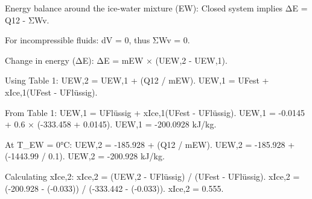 Energy balance around the ice-water mixture (EW):  
Closed system implies ΔE = Q12 - ΣWv.  

For incompressible fluids:  
dV = 0, thus ΣWv = 0.  

Change in energy (ΔE):  
ΔE = mEW × (UEW,2 - UEW,1).  

Using Table 1:  
UEW,2 = UEW,1 + (Q12 / mEW).  
UEW,1 = UFest + xIce,1(UFest - UFlüssig).  

From Table 1:  
UEW,1 = UFlüssig + xIce,1(UFest - UFlüssig).  
UEW,1 = -0.0145 + 0.6 × (-333.458 + 0.0145).  
UEW,1 = -200.0928 kJ/kg.  

At T_EW = 0°C:  
UEW,2 = -185.928 + (Q12 / mEW).  
UEW,2 = -185.928 + (-1443.99 / 0.1).  
UEW,2 = -200.928 kJ/kg.  

Calculating xIce,2:  
xIce,2 = (UEW,2 - UFlüssig) / (UFest - UFlüssig).  
xIce,2 = (-200.928 - (-0.033)) / (-333.442 - (-0.033)).  
xIce,2 = 0.555.